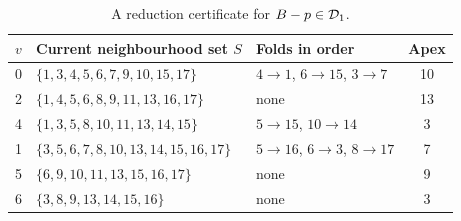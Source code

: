\begin{table}[H]
\centering\small\setlength{\tabcolsep}{4pt}
\caption{A reduction certificate for \(B-p\in\mathcal D_1\).}\label{6k6:tab:Bpos}
\begin{tabular}{c p{} p{} c}
\toprule
$v$ & Current neighbourhood set $S$ & Folds in order & Apex\\
\midrule

0 & \(\{1,3,4,5,6,7,9,10,15,17\}\) & \(4\to 1\), \(6\to 15\), \(3\to 7\) & 10\\
2 & \(\{1,4,5,6,8,9,11,13,16,17\}\) & none & 13\\
4 & \(\{1,3,5,8,10,11,13,14,15\}\) & \(5\to 15\), \(10\to 14\) & 3\\
1 & \(\{3,5,6,7,8,10,13,14,15,16,17\}\) & \(5\to 16\), \(6\to 3\), \(8\to 17\) & 7\\
5 & \(\{6,9,10,11,13,15,16,17\}\) & none & 9\\
6 & \(\{3,8,9,13,14,15,16\}\) & none & 3\\
\bottomrule
\end{tabular}
\end{table}
